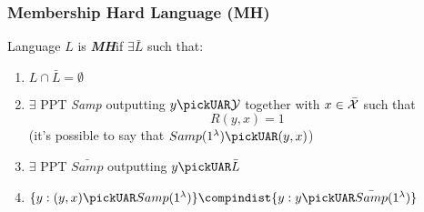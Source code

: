 \subsubsection{Membership Hard Language (MH)}
\begin{definition}
    Language $L$ is \textit{ \textbf{MH}}if $ \exists  \bar{L}$ such that:
    \begin{enumerate}
        \item $L \cap \bar{L} = \emptyset$
        \item $ \exists$ PPT \textit{Samp} outputting $y \pickUAR \mathcal{Y}$
            together with $x \in \bar{\mathcal{X}}$ such that 
            \[
              R(y,x)=1  
            \]
            (it's possible
            to say that $Samp(1^{\lambda}) \pickUAR (y,x)$)
        \item $ \exists$ PPT $\bar{Samp}$ outputting $y \pickUAR \bar{L}$
        \item $\{y:(y,x) \pickUAR Samp(1^{\lambda})\} \compindist \{y:y
            \pickUAR \bar{Samp}(1^{\lambda})\}$
    \end{enumerate}
    
\end{definition}

